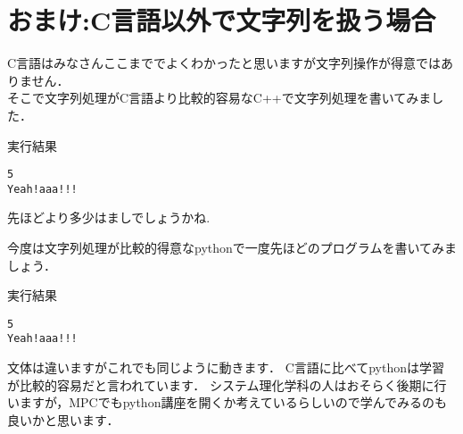 \section{おまけ:C言語以外で文字列を扱う場合}
C言語はみなさんここまででよくわかったと思いますが文字列操作が得意ではありません．\\
そこで文字列処理がC言語より比較的容易なC++で文字列処理を書いてみました．

\begin{itembox}[]{実行結果}
\begin{verbatim}
5
Yeah!aaa!!!
\end{verbatim}
\end{itembox}
先ほどより多少はましでしょうかね.

今度は文字列処理が比較的得意なpythonで一度先ほどのプログラムを書いてみましょう．

\begin{itembox}[]{実行結果}
\begin{verbatim}
5
Yeah!aaa!!!
\end{verbatim}
\end{itembox}

文体は違いますがこれでも同じように動きます．
C言語に比べてpythonは学習が比較的容易だと言われています．
システム理化学科の人はおそらく後期に行いますが，MPCでもpython講座を開くか考えているらしいので学んでみるのも良いかと思います．
